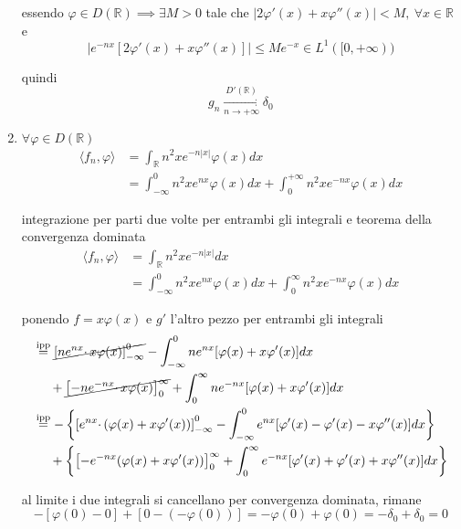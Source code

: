 \begin{enumerate}
essendo $\varphi \in D(\mathbb{R}) \implies \exists M >0$ tale che $| 2\varphi '( x) +x\varphi ''( x)| < M,\ \forall x\in \mathbb{R}$ e\begin{equation*}
\left| e^{-nx}[ 2\varphi '( x) +x\varphi ''( x)]\right| \leqslant Me^{-x} \in L^{1}([ 0,+\infty ))
\end{equation*}

quindi\begin{equation*}
g_{n}\xrightarrow[n\rightarrow +\infty ]{D'(\mathbb{R})} \delta _{0}
\end{equation*}
\item $\forall \varphi \in D(\mathbb{R})$\begin{equation*}
\begin{aligned}
\langle f_{n} ,\varphi \rangle  & =\int _{\mathbb{R}} n^{2} xe^{-n| x| } \varphi ( x) dx\\
 & =\int ^{0}_{-\infty } n^{2} xe^{nx} \varphi ( x) dx+\int ^{+\infty }_{0} n^{2} xe^{-nx} \varphi ( x) dx
\end{aligned}
\end{equation*}

integrazione per parti due volte per entrambi gli integrali e teorema della convergenza dominata\begin{align*}
\langle f_{n} ,\varphi \rangle  & =\int _{\mathbb{R}} n^{2} xe^{-n| x| } dx\\
 & =\int ^{0}_{-\infty } n^{2} xe^{nx} \varphi ( x) dx+\int ^{\infty }_{0} n^{2} xe^{-nx} \varphi ( x) dx
\end{align*}

ponendo $f=x\varphi ( x)$ e $g'$ l'altro pezzo per entrambi gli integrali\begin{align*}
 & \overset{\text{ipp}}{=}\cancel{\left[ ne^{nx} \cdotp x\varphi ( x)\right]^{0}_{-\infty }} -\int ^{0}_{-\infty } ne^{nx}[ \varphi ( x) +x\varphi '( x)] dx\\
 & \ \ \ \ +\cancel{\left[ -ne^{-nx} \cdotp x\varphi ( x)\right]^{\infty }_{0}} +\int ^{\infty }_{0} ne^{-nx}[ \varphi ( x) +x\varphi '( x)] dx\\
 & \overset{\text{ipp}}{=} -\left\{\left[ e^{nx} \cdotp ( \varphi ( x) +x\varphi '( x))\right]^{0}_{-\infty } -\int ^{0}_{-\infty } e^{nx}[ \varphi '( x) -\varphi '( x) -x\varphi ''( x)] dx\right\}\\
 & \ \ \ \ +\left\{\left[ -e^{-nx}( \varphi ( x) +x\varphi '( x))\right]^{\infty }_{0} +\int ^{\infty }_{0} e^{-nx}[ \varphi '( x) +\varphi '( x) +x\varphi ''( x)] dx\right\}
\end{align*}

al limite i due integrali si cancellano per convergenza dominata, rimane\begin{equation*}
-[ \varphi ( 0) -0] +[ 0-( -\varphi ( 0))] =-\varphi ( 0) +\varphi ( 0) =-\delta _{0} +\delta _{0} =0
\end{equation*}
\end{enumerate}

